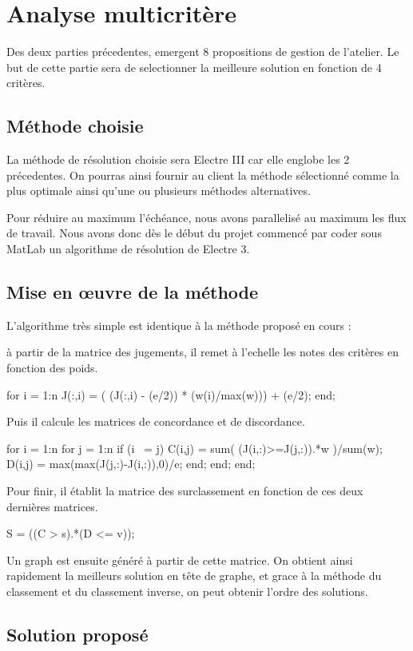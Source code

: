 \section{Analyse multicritère}

Des deux parties précedentes, emergent 8 propositions de gestion de l'atelier.
Le but de cette partie sera de selectionner la meilleure solution en fonction de 4 critères.

\subsection{Méthode choisie}

La méthode de résolution choisie sera Electre III car elle englobe les 2 précedentes.
On pourras ainsi fournir au client la méthode sélectionné comme la plus optimale ainsi qu'une ou plusieurs méthodes alternatives.

Pour réduire au maximum l'échéance, nous avons parallelisé au maximum les flux de travail.
Nous avons donc dès le début du projet commencé par coder sous MatLab un algorithme de résolution de Electre 3.

\subsection{Mise en œuvre de la méthode}

L'algorithme très simple est identique à la méthode proposé en cours :

à partir de la matrice des jugements, il remet à l'echelle les notes des critères en fonction des poids.

for i = 1:n
	J(:,i) = ( (J(:,i) - (e/2)) * (w(i)/max(w))) + (e/2);
end;

Puis il calcule les matrices de concordance et de discordance.

for i = 1:n
    for j = 1:n
        if (i ~= j)
            C(i,j) = sum( (J(i,:)>=J(j,:)).*w )/sum(w);
            D(i,j) = max(max(J(j,:)-J(i,:)),0)/e;
        end;
    end;
end;

Pour finir, il établit la matrice des surclassement en fonction de ces deux dernières matrices.

S = ((C > s).*(D <= v));

Un graph est ensuite généré à partir de cette matrice.
On obtient ainsi rapidement la meilleurs solution en tête de graphe, et grace à la méthode du classement et du classement inverse, on peut obtenir l'ordre des solutions.

\subsection{Solution proposé}

